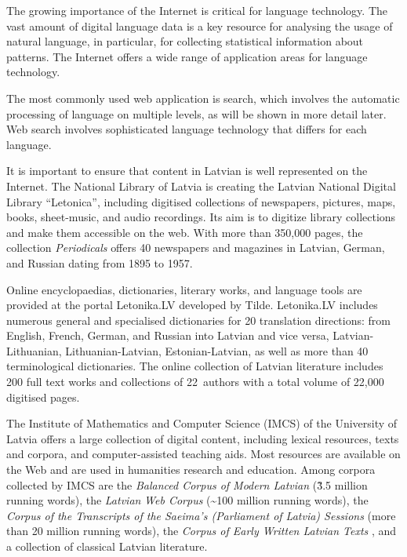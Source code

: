 \begin{multicols}{2}
The growing importance of the Internet is critical for language technology.
The vast amount of digital language data is a key resource for analysing the usage of natural language, in particular, for collecting statistical information about patterns.
The Internet offers a wide range of application areas for language technology.

The most commonly used web application is search, which involves the automatic processing of language on multiple levels, as will be shown in more detail later.
Web search involves sophisticated language technology that differs for each language.

It is important to ensure that content in Latvian is well represented on the Internet.
The National Library of Latvia is creating the Latvian National Digital Library ``Letonica'', including digitised collections of newspapers, pictures, maps, books, sheet-music, and audio recordings.
Its aim is to digitize library collections and make them accessible on the web.
With more than 350,000 pages, the collection \textit{Periodicals} \cite{Meta6} offers 40 newspapers and magazines in Latvian, German, and Russian dating from 1895 to 1957.

Online encyclopaedias, dictionaries, literary works, and language tools are provided at the portal Letonika.LV developed by Tilde.
Letonika.LV includes numerous general and specialised dictionaries for 20 translation directions: from English, French, German, and Russian into Latvian and vice versa, Latvian-Lithuanian, Lithuanian-Latvian, Estonian-Latvian, as well as more than 40 terminological dictionaries.
The online collection of Latvian literature includes 200 full text works and collections of 22~authors with a total volume of 22,000 digitised pages.

The Institute of Mathematics and Computer Science (IMCS) of the University of Latvia offers a large collection of digital content, including lexical resources, texts and corpora, and computer-assisted teaching aids.
Most resources are available on the Web \cite{Meta7} and are used in humanities research and education.
Among corpora collected by IMCS are the \textit{Balanced Corpus of Modern Latvian} \cite{Meta8} (\~3.5 million running words), the \textit{Latvian} \textit{Web Corpus} (\~{}100 million running words), the \textit{Corpus of the Transcripts of the Saeima's (Parliament of Latvia) Sessions} (more than 20 million running words), the \textit{Corpus of Early Written Latvian Texts} \cite{Meta9} \cite{metaAndronova}, and a collection of classical Latvian literature.


\end{multicols}
